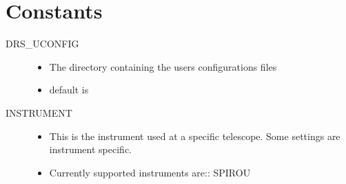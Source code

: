 \documentclass[a4paper,10pt,english]{report}
\begin{document}
\section{Constants}
\label{\detokenize{misc/glossary:constants}}\label{\detokenize{misc/glossary:glossary}}\label{\detokenize{misc/glossary::doc}}\begin{description}
\item[{DRS\_UCONFIG\label{\detokenize{misc/glossary:term-drs-uconfig}}}] \leavevmode\begin{itemize}
\item {} 
The directory containing the users configurations files

\item {} 
default is 

\end{itemize}

\item[{INSTRUMENT\label{\detokenize{misc/glossary:term-instrument}}}] \leavevmode\begin{itemize}
\item {} 
This is the instrument used at a specific telescope. Some settings are instrument specific.

\item {} 
Currently supported instruments are::
SPIROU

\end{itemize}

\end{description}
\end{document}

